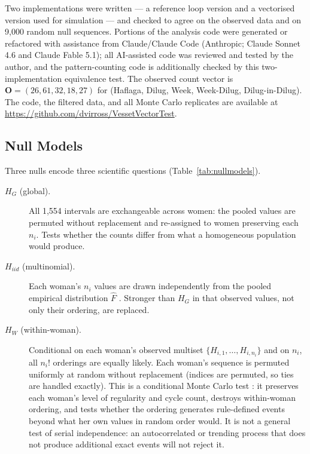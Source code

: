 \documentclass[12pt]{article}
\newcommand{\HG}{H_{G}}
\newcommand{\HI}{H_{iid}}
\newcommand{\HW}{H_{W}}
\begin{document}
Two implementations were written --- a reference loop version and a vectorised version
used for simulation --- and checked to agree on the observed data and on 9,000 random
null sequences. Portions of the analysis code were generated or refactored with
assistance from Claude/Claude Code (Anthropic; Claude Sonnet 4.6 and Claude Fable 5.1);
all AI-assisted code was reviewed and tested by the author, and the pattern-counting code
is additionally checked by this two-implementation equivalence test. The observed count
vector is
$\mathbf{O} = (26, 61, 32, 18, 27)$ for (Haflaga, Dilug, Week, Week-Dilug,
Dilug-in-Dilug). The code, the filtered data, and all Monte Carlo replicates are
available at \url{https://github.com/dvirross/VessetVectorTest}.

\subsection{Null Models}
\label{sec:nullmodels}

Three nulls encode three scientific questions (Table~\ref{tab:nullmodels}).
\begin{description}
  \item[$\HG$ \textnormal{(global).}] All 1,554 intervals are
    exchangeable across women: the pooled values are permuted without replacement and
    re-assigned to women preserving each $n_i$. Tests whether the counts differ from what
    a homogeneous population would produce.
  \item[$\HI$ \textnormal{(multinomial).}] Each woman's $n_i$ values are drawn
    independently from the pooled empirical distribution $\hat F$ \citep{ross2022phd}.
    Stronger than $\HG$ in that observed values, not only their ordering, are replaced.
  \item[$\HW$ \textnormal{(within-woman).}] Conditional on each woman's
    observed multiset $\{H_{i,1}, \ldots, H_{i,n_i}\}$ and on $n_i$, all $n_i!$ orderings
    are equally likely. Each woman's sequence is permuted uniformly at random without
    replacement (indices are permuted, so ties are handled exactly). This is a
    conditional Monte Carlo test \citep{hemerik2018}: it preserves each woman's level of
    regularity and cycle count, destroys within-woman ordering, and tests whether the
    ordering generates rule-defined events beyond what her own values in random order
    would. It is not a general test of serial independence: an autocorrelated or trending
    process that does not produce additional exact events will not reject it.
\end{description}
\end{document}
